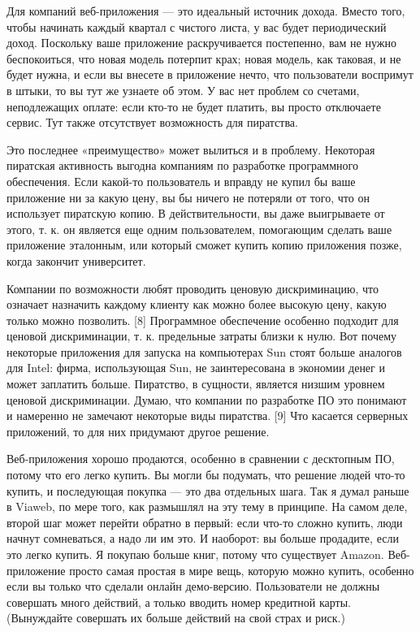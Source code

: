 \documentclass[ebook,12pt,oneside,openany]{memoir}
\begin{document}
Для компаний веб-приложения — это идеальный источник дохода. Вместо
того, чтобы начинать каждый квартал с чистого листа, у вас будет
периодический доход. Поскольку ваше приложение раскручивается
постепенно, вам не нужно беспокоиться, что новая модель потерпит крах;
новая модель, как таковая, и не будет нужна, и если вы внесете в
приложение нечто, что пользователи воспримут в штыки, то вы тут же
узнаете об этом. У вас нет проблем со счетами, неподлежащих оплате:
если кто-то не будет платить, вы просто отключаете сервис. Тут также
отсутствует возможность для пиратства.

Это последнее «преимущество» может вылиться и в проблему. Некоторая
пиратская активность выгодна компаниям по разработке программного
обеспечения. Если какой-то пользователь и вправду не купил бы ваше
приложение ни за какую цену, вы бы ничего не потеряли от того, что он
использует пиратскую копию. В действительности, вы даже выигрываете от
этого, т. к. он является еще одним пользователем, помогающим сделать
ваше приложение эталонным, или который сможет купить копию приложения
позже, когда закончит университет.

Компании по возможности любят проводить ценовую дискриминацию, что
означает назначить каждому клиенту как можно более высокую цену, какую
только можно позволить. [8] Программное обеспечение особенно подходит
для ценовой дискриминации, т. к. предельные затраты близки к нулю. Вот
почему некоторые приложения для запуска на компьютерах Sun стоят
больше аналогов для Intel: фирма, использующая Sun, не заинтересована
в экономии денег и может заплатить больше. Пиратство, в сущности,
является низшим уровнем ценовой дискриминации. Думаю, что компании по
разработке ПО это понимают и намеренно не замечают некоторые виды
пиратства. [9] Что касается серверных приложений, то для них придумают
другое решение.

Веб-приложения хорошо продаются, особенно в сравнении с десктопным ПО,
потому что его легко купить. Вы могли бы подумать, что решение людей
что-то купить, и последующая покупка — это два отдельных шага. Так я
думал раньше в Viaweb, по мере того, как размышлял на эту тему в
принципе. На самом деле, второй шаг может перейти обратно в первый:
если что-то сложно купить, люди начнут сомневаться, а надо ли им это.
И наоборот: вы больше продадите, если это легко купить. Я покупаю
больше книг, потому что существует Amazon. Веб-приложение просто самая
простая в мире вещь, которую можно купить, особенно если вы только что
сделали онлайн демо-версию. Пользователи не должны совершать много
действий, а только вводить номер кредитной карты. (Вынуждайте
совершать их больше действий на свой страх и риск.)
\end{document}
